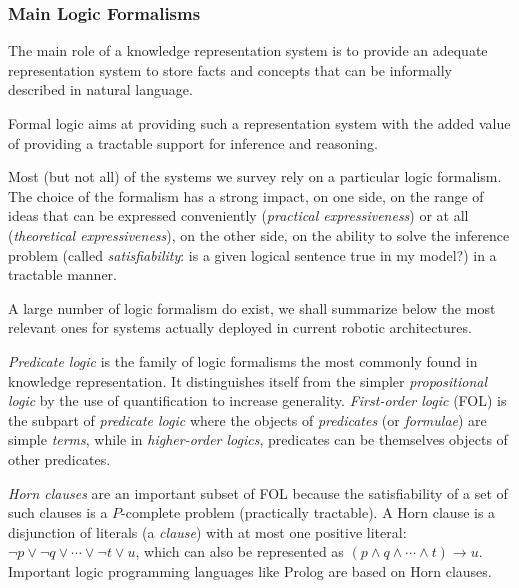 \begin{scriptsize}
\begin{center}
\end{center}
\end{scriptsize}


\subsubsection{Main Logic Formalisms}

The main role of a knowledge representation system is to provide an adequate
representation system to store facts and concepts that can be informally
described in natural language.

Formal logic aims at providing such a representation system with the added
value of providing a tractable support for inference and reasoning.

Most (but not all) of the systems we survey rely on a particular logic
formalism. The choice of the formalism has a strong impact, on one side, on the
range of ideas that can be expressed conveniently (\emph{practical
expressiveness}) or at all (\emph{theoretical expressiveness}), on the other
side, on the ability to solve the inference problem (called
\emph{satisfiability}: is a given logical sentence true in my model?) in a
tractable manner.

A large number of logic formalism do exist, we shall summarize below the most
relevant ones for systems actually deployed in current robotic architectures.

\emph{Predicate logic} is the family of logic formalisms the most commonly
found in knowledge representation. It distinguishes itself from the simpler
\emph{propositional logic} by the use of quantification to increase generality.
\emph{First-order logic} (FOL) is the subpart of \emph{predicate logic} where the
objects of \emph{predicates} (or \emph{formulae}) are simple \emph{terms},
while in \emph{higher-order logics}, predicates can be themselves objects of
other predicates.

\emph{Horn clauses} are an important subset of FOL because the satisfiability
of a set of such clauses is a $P$-complete problem (\ie practically tractable).
A Horn clause is a disjunction of literals (a \emph{clause}) with at most one
positive literal: $\neg p \lor \neg q \lor \cdots \lor \neg t \lor u$, which
can also be represented as $(p \land q \land \cdots \land t) \rightarrow u$.
Important logic programming languages like Prolog are based on Horn clauses.

